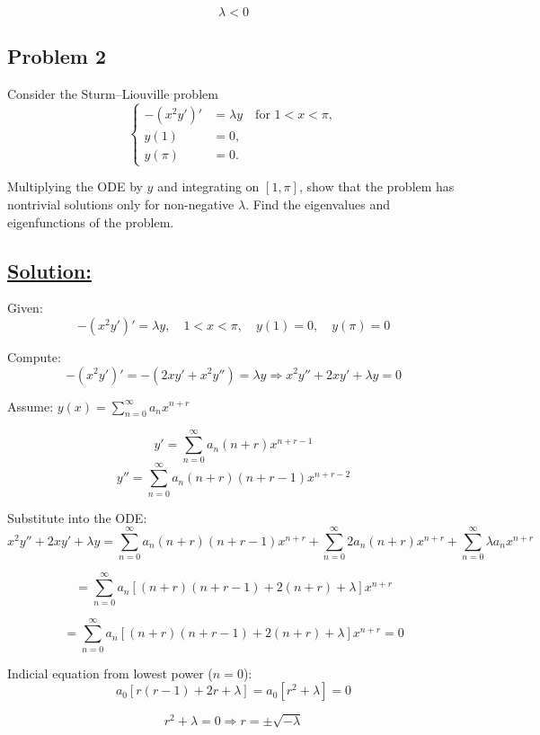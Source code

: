 \documentclass{article}
\begin{document}
\[
\boxed{\lambda < 0}
\]


\newpage

\begin{tcolorbox}[colback=white, colframe=black, boxrule=0.8pt, arc=2mm]

\section*{Problem 2}
Consider the Sturm–Liouville problem
\[
\left\{
\begin{aligned}
-(x^2 y')' &= \lambda y \quad \text{for } 1 < x < \pi, \\
y(1) &= 0, \\
y(\pi) &= 0.
\end{aligned}
\right.
\]

Multiplying the ODE by $y$ and integrating on $[1, \pi]$, show that the problem has nontrivial solutions only for non-negative $\lambda$. Find the eigenvalues and eigenfunctions of the problem.

\end{tcolorbox}

\subsection*{\underline{Solution:}}

Given:
\[
-(x^2 y')' = \lambda y, \quad 1 < x < \pi, \quad y(1) = 0, \quad y(\pi) = 0
\]

Compute:
\[
-(x^2 y')' = -\left(2x y' + x^2 y''\right) = \lambda y
\Rightarrow x^2 y'' + 2x y' + \lambda y = 0
\]

Assume: $y(x) = \sum_{n=0}^{\infty} a_n x^{n+r}$

\[
y' = \sum_{n=0}^{\infty} a_n (n+r) x^{n+r-1}
\]
\[
y'' = \sum_{n=0}^{\infty} a_n (n+r)(n+r-1) x^{n+r-2}
\]

Substitute into the ODE:
\[
x^2 y'' + 2x y' + \lambda y = \sum_{n=0}^{\infty} a_n (n+r)(n+r-1) x^{n+r} + \sum_{n=0}^{\infty} 2a_n (n+r) x^{n+r} + \sum_{n=0}^{\infty} \lambda a_n x^{n+r}
\]

\[
= \sum_{n=0}^{\infty} a_n \left[ (n+r)(n+r-1) + 2(n+r) + \lambda \right] x^{n+r}
\]

\[
= \sum_{n=0}^{\infty} a_n \left[ (n+r)(n+r-1) + 2(n+r) + \lambda \right] x^{n+r} = 0
\]

Indicial equation from lowest power ($n = 0$):
\[
a_0 \left[ r(r-1) + 2r + \lambda \right] = a_0 \left[ r^2 + \lambda \right] = 0
\]

\[
r^2 + \lambda = 0 \Rightarrow r = \pm \sqrt{-\lambda}
\]
\end{document}
